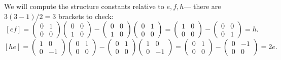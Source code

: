 \documentclass{article}
\newcommand{\lb}[1]{\ensuremath{\left[{#1}\right]}}
\begin{document}
We will compute the structure constants relative to $e,f,h$--- there are $3(3-1)/2 = 3$ brackets to check:
\[
    \lb{ef}
    =
    \begin{pmatrix}
        0 & 1 \\
        0 & 0 
    \end{pmatrix}
    \begin{pmatrix}
        0 & 0 \\
        1 & 0 
    \end{pmatrix}
    -
    \begin{pmatrix}
        0 & 0 \\
        1 & 0 
    \end{pmatrix}
    \begin{pmatrix}
        0 & 1 \\
        0 & 0 
    \end{pmatrix}
    =
    \begin{pmatrix}
        1 & 0 \\
        0 & 0 
    \end{pmatrix}
    -
    \begin{pmatrix}
        0 & 0 \\
        0 & 1 
    \end{pmatrix}
    =
    h.
\]
\[
    \lb{he}
    =
    \begin{pmatrix}
        1 & 0 \\
        0 & -1 
    \end{pmatrix}
    \begin{pmatrix}
        0 & 1 \\
        0 & 0 
    \end{pmatrix}
    -
    \begin{pmatrix}
        0 & 1 \\
        0 & 0 
    \end{pmatrix}
    \begin{pmatrix}
        1 & 0 \\
        0 & -1 
    \end{pmatrix}
    =
    \begin{pmatrix}
        0 & 1 \\
        0 & 0 
    \end{pmatrix}
    -
    \begin{pmatrix}
        0 & -1 \\
        0 & 0 
    \end{pmatrix}
    =
    2e.
\]
\end{document}
